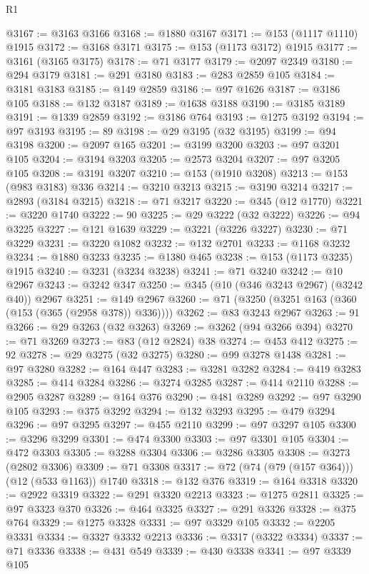 \begin{lexlean}{R1}
\begin{coremodule}
{{{{{{{{{{{{{{{{{{{{{{{{{{{{{{{{{{{{{{{{{{{{{{{{{{{{{{{{{{{{{{{{{{{{{{{{{{{{{{{{{{{{{{{{{{{{{{{{{{{{{{{{{{{{{{{{{{{{{{{{{{{{{{{{{{{{{{{{{{{{{{{{{{{{{{{{{{{{{{{{{{{{{{{{{{{{{{{{{{{{{{{{{{@3167 := @3163 @3166
@3168 := @1880 @3167
@3171 := @153 (@1117 @1110) @1915
@3172 := @3168 @3171
@3175 := @153 (@1173 @3172) @1915
@3177 := @3161 (@3165 @3175)
@3178 := @71 @3177
@3179 := @2097 @2349
@3180 := @294 @3179
@3181 := @291 @3180
@3183 := @283 @2859 @105
@3184 := @3181 @3183
@3185 := @149 @2859
@3186 := @97 @1626
@3187 := @3186 @105
@3188 := @132 @3187
@3189 := @1638 @3188
@3190 := @3185 @3189
@3191 := @1339 @2859
@3192 := @3186 @764
@3193 := @1275 @3192
@3194 := @97 @3193
@3195 := 89
@3198 := @29 @3195 (@32 @3195)
@3199 := @94 @3198
@3200 := @2097 @165
@3201 := @3199 @3200
@3203 := @97 @3201 @105
@3204 := @3194 @3203
@3205 := @2573 @3204
@3207 := @97 @3205 @105
@3208 := @3191 @3207
@3210 := @153 (@1910 @3208)
@3213 := @153 (@983 @3183) @336
@3214 := @3210 @3213
@3215 := @3190 @3214
@3217 := @2893 (@3184 @3215)
@3218 := @71 @3217
@3220 := @345 (@12 @1770)
@3221 := @3220 @1740
@3222 := 90
@3225 := @29 @3222 (@32 @3222)
@3226 := @94 @3225
@3227 := @121 @1639
@3229 := @3221 (@3226 @3227)
@3230 := @71 @3229
@3231 := @3220 @1082
@3232 := @132 @2701
@3233 := @1168 @3232
@3234 := @1880 @3233
@3235 := @1380 @465
@3238 := @153 (@1173 @3235) @1915
@3240 := @3231 (@3234 @3238)
@3241 := @71 @3240
@3242 := @10 @2967
@3243 := @3242 @347
@3250 := @345 (@10 (@346 @3243 @2967) (@3242 @40)) @2967
@3251 := @149 @2967
@3260 := @71 (@3250 (@3251 @163 (@360 (@153 (@365 (@2958 @378)) @336))))
@3262 := @83 @3243 @2967
@3263 := 91
@3266 := @29 @3263 (@32 @3263)
@3269 := @3262 (@94 @3266 @394)
@3270 := @71 @3269
@3273 := @83 (@12 @2824) @38
@3274 := @453 @412
@3275 := 92
@3278 := @29 @3275 (@32 @3275)
@3280 := @99 @3278 @1438
@3281 := @97 @3280
@3282 := @164 @447
@3283 := @3281 @3282
@3284 := @419 @3283
@3285 := @414 @3284
@3286 := @3274 @3285
@3287 := @414 @2110
@3288 := @2905 @3287
@3289 := @164 @376
@3290 := @481 @3289
@3292 := @97 @3290 @105
@3293 := @375 @3292
@3294 := @132 @3293
@3295 := @479 @3294
@3296 := @97 @3295
@3297 := @455 @2110
@3299 := @97 @3297 @105
@3300 := @3296 @3299
@3301 := @474 @3300
@3303 := @97 @3301 @105
@3304 := @472 @3303
@3305 := @3288 @3304
@3306 := @3286 @3305
@3308 := @3273 (@2802 @3306)
@3309 := @71 @3308
@3317 := @72 (@74 (@79 (@157 @364))) (@12 (@533 @1163)) @1740
@3318 := @132 @376
@3319 := @164 @3318
@3320 := @2922 @3319
@3322 := @291 @3320 @2213
@3323 := @1275 @2811
@3325 := @97 @3323 @370
@3326 := @464 @3325
@3327 := @291 @3326
@3328 := @375 @764
@3329 := @1275 @3328
@3331 := @97 @3329 @105
@3332 := @2205 @3331
@3334 := @3327 @3332 @2213
@3336 := @3317 (@3322 @3334)
@3337 := @71 @3336
@3338 := @431 @549
@3339 := @430 @3338
@3341 := @97 @3339 @105
}}}}}}}}}}}}}}}}}}}}}}}}}}}}}}}}}}}}}}}}}}}}}}}}}}}}}}}}}}}}}}}}}}}}}}}}}}}}}}}}}}}}}}}}}}}}}}}}}}}}}}}}}}}}}}}}}}}}}}}}}}}}}}}}}}}}}}}}}}}}}}}}}}}}}}}}}}}}}}}}}}}}}}}}}}}}}}}}}}}}}}}}}}
\end{coremodule}
\end{lexlean}
